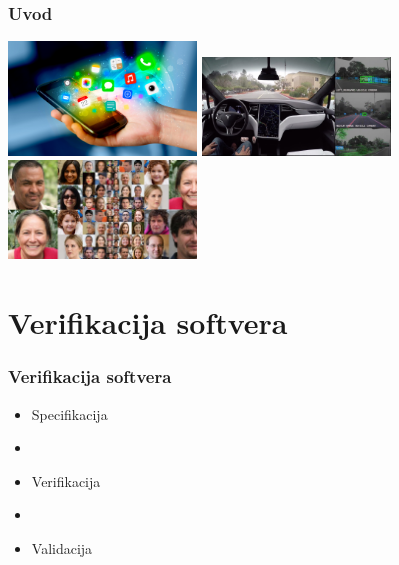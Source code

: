 \documentclass[14pt]{beamer}
\begin{document}
\begin{frame}
	\frametitle{Uvod}
     \hfil\hfil\includegraphics[width=5cm]{mobilni}\newline
     \null\hfil\hfil{}\newline
     \vfil
     \hfil\hfil\includegraphics[width=5cm]{tesla}\hfil\hfil
       \includegraphics[width=5cm]{faces}\newline
     \null\hfil\hfil{}
       \hfil\hfil{}
\end{frame}

\section{Verifikacija softvera}
\begin{frame}
\frametitle{Verifikacija softvera}
\begin{itemize}
\item Specifikacija 
\item[]
\item Verifikacija 
\item[]
\item Validacija
\end{itemize}
\end{frame}
\end{document}
